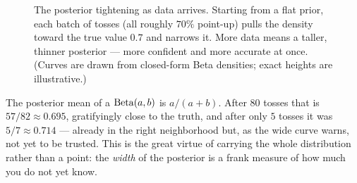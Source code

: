 \begin{figure}[H]
\centering
{}
\caption{The posterior tightening as data arrives. Starting from a flat prior, each batch
of tosses (all roughly $70\%$ point-up) pulls the density toward the true value $0.7$ and
narrows it. More data means a taller, thinner posterior --- more confident and more
accurate at once. (Curves are drawn from closed-form Beta densities; exact heights are
illustrative.)}
\label{ch31:fig-tighten}
\end{figure}

The posterior mean of a $\operatorname{Beta}(a,b)$ is $a/(a+b)$. After $80$ tosses that is
$57/82 \approx 0.695$, gratifyingly close to the truth, and after only $5$ tosses it was
$5/7 \approx 0.714$ --- already in the right neighborhood but, as the wide curve warns, not
yet to be trusted. This is the great virtue of carrying the whole distribution rather than
a point: the \emph{width} of the posterior is a frank measure of how much you do not
yet know.

